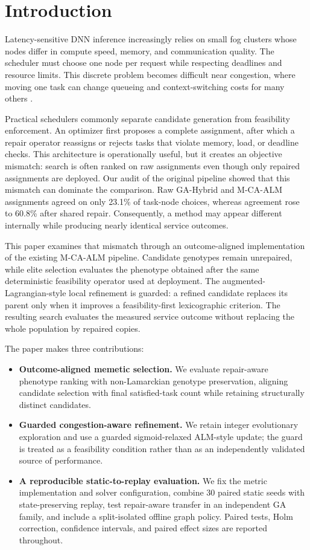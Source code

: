 \documentclass[pdflatex,sn-mathphys-num]{sn-jnl}
\begin{document}
\section{Introduction}

Latency-sensitive DNN inference increasingly relies on small fog clusters whose nodes differ in compute speed, memory, and communication quality. The scheduler must choose one node per request while respecting deadlines and resource limits. This discrete problem becomes difficult near congestion, where moving one task can change queueing and context-switching costs for many others \cite{Mao2017}.

Practical schedulers commonly separate candidate generation from feasibility enforcement. An optimizer first proposes a complete assignment, after which a repair operator reassigns or rejects tasks that violate memory, load, or deadline checks. This architecture is operationally useful, but it creates an objective mismatch: search is often ranked on raw assignments even though only repaired assignments are deployed. Our audit of the original pipeline showed that this mismatch can dominate the comparison. Raw GA-Hybrid and M-CA-ALM assignments agreed on only 23.1\% of task-node choices, whereas agreement rose to 60.8\% after shared repair. Consequently, a method may appear different internally while producing nearly identical service outcomes.

This paper examines that mismatch through an outcome-aligned implementation of the existing M-CA-ALM pipeline. Candidate genotypes remain unrepaired, while elite selection evaluates the phenotype obtained after the same deterministic feasibility operator used at deployment. The augmented-Lagrangian-style local refinement is guarded: a refined candidate replaces its parent only when it improves a feasibility-first lexicographic criterion. The resulting search evaluates the measured service outcome without replacing the whole population by repaired copies.

The paper makes three contributions:
\begin{itemize}
    \item \textbf{Outcome-aligned memetic selection.} We evaluate repair-aware phenotype ranking with non-Lamarckian genotype preservation, aligning candidate selection with final satisfied-task count while retaining structurally distinct candidates.
    \item \textbf{Guarded congestion-aware refinement.} We retain integer evolutionary exploration and use a guarded sigmoid-relaxed ALM-style update; the guard is treated as a feasibility condition rather than as an independently validated source of performance.
    \item \textbf{A reproducible static-to-replay evaluation.} We fix the metric implementation and solver configuration, combine 30 paired static seeds with state-preserving replay, test repair-aware transfer in an independent GA family, and include a split-isolated offline graph policy. Paired tests, Holm correction, confidence intervals, and paired effect sizes are reported throughout.
\end{itemize}
\end{document}
